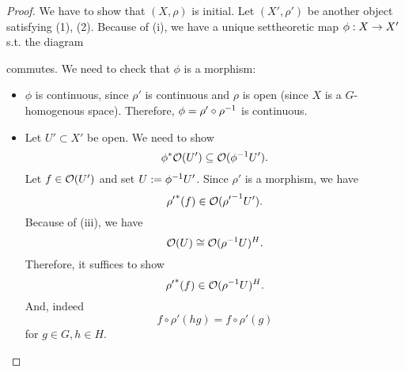 \begin{proof}
	We have to show that $(X,\rho)$ is initial. Let $(X', \rho')$ be another object satisfying (1), (2).
	Because of (i), we have a unique settheoretic map $\phi : X \overset{}{\rightarrow} X'$ s.t. the diagram
	\begin{center}
	\end{center}
commutes. We need to check that $\phi$ is a morphism:
\begin{itemize}
	\item $\phi$ is continuous, since $\rho'$ is continuous and $\rho$ is open (since $X$ is a $G$-homogenous space). Therefore, $\phi = \rho' \circ \rho^{-1}$ is continuous.
	\item Let $U' \subset X'$ be open. We need to show
	\[ \phi^* \mathcal{O}(U') \subseteq \mathcal{O}(\phi^{-1} U'). \]
	Let $f \in \mathcal{O}(U')$ and set $U := \phi^{-1} U'$. Since $\rho'$ is a morphism, we have
	\[ {\rho'}^*(f) \in \mathcal{O}({\rho'}^{-1} U'). \]
	Because of (iii), we have
	\[ \mathcal{O}(U) \overset{}{\cong} \mathcal{O}(\rho^{-1} U)^H. \]
	Therefore, it suffices to show
	\[ {\rho'}^*(f) \in \mathcal{O}(\rho^{-1} U)^H. \]
	And, indeed
	\[ f \circ \rho'(hg) = f \circ \rho'(g) \]
	for $g \in G, h \in H$.
\end{itemize}
\end{proof}

